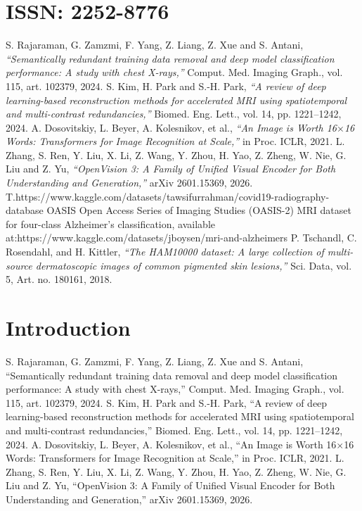 \documentclass[final,5p,times,twocolumn,authoryear]{elsarticle}
\begin{document}
\section{ISSN: 2252-8776}
S. Rajaraman, G. Zamzmi, F. Yang, Z. Liang, Z. Xue and S. Antani, \textit{“Semantically redundant training data removal and deep model classification performance: A study with chest X-rays,”} Comput. Med. Imaging Graph., vol. 115, art. 102379, 2024.
S. Kim, H. Park and S.-H. Park, \textit{“A review of deep learning-based reconstruction methods for accelerated MRI using spatiotemporal and multi-contrast redundancies,”} Biomed. Eng. Lett., vol. 14, pp. 1221–1242, 2024.
A. Dosovitskiy, L. Beyer, A. Kolesnikov, et al., \textit{“An Image is Worth 16$\times$16 Words: Transformers for Image Recognition at Scale,”} in Proc. ICLR, 2021.
L. Zhang, S. Ren, Y. Liu, X. Li, Z. Wang, Y. Zhou, H. Yao, Z. Zheng, W. Nie, G. Liu and Z. Yu, \textit{“OpenVision 3: A Family of Unified Visual Encoder for Both Understanding and Generation,”} arXiv 2601.15369, 2026.
T.https://www.kaggle.com/datasets/tawsifurrahman/covid19-radiography-database
OASIS Open Access Series of Imaging Studies (OASIS-2) MRI dataset for four-class Alzheimer’s classification, available at:https://www.kaggle.com/datasets/jboysen/mri-and-alzheimers
P. Tschandl, C. Rosendahl, and H. Kittler, \textit{“The HAM10000 dataset: A large collection of multi-source dermatoscopic images of common pigmented skin lesions,”} Sci. Data, vol. 5, Art. no. 180161, 2018.

\section{Introduction}
S. Rajaraman, G. Zamzmi, F. Yang, Z. Liang, Z. Xue and S. Antani, “Semantically redundant training data removal and deep model classification performance: A study with chest X-rays,” Comput. Med. Imaging Graph., vol. 115, art. 102379, 2024.
S. Kim, H. Park and S.-H. Park, “A review of deep learning-based reconstruction methods for accelerated MRI using spatiotemporal and multi-contrast redundancies,” Biomed. Eng. Lett., vol. 14, pp. 1221–1242, 2024.
A. Dosovitskiy, L. Beyer, A. Kolesnikov, et al., “An Image is Worth 16$\times$16 Words: Transformers for Image Recognition at Scale,” in Proc. ICLR, 2021.
L. Zhang, S. Ren, Y. Liu, X. Li, Z. Wang, Y. Zhou, H. Yao, Z. Zheng, W. Nie, G. Liu and Z. Yu, “OpenVision 3: A Family of Unified Visual Encoder for Both Understanding and Generation,” arXiv 2601.15369, 2026.
\end{document}
